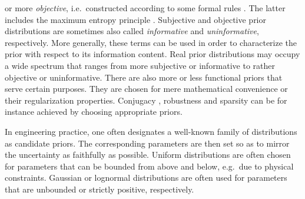 or more \emph{objective}, i.e.\ constructed according to some formal rules \cite{Bayesian:Kass1996,Bayesian:Ghosh2011}.
The latter includes the maximum entropy principle \cite{Statistics:Jaynes1957:a,Statistics:Jaynes1957:a,Bayesian:Jaynes1968}.
Subjective and objective prior distributions are sometimes also called \emph{informative} and \emph{uninformative}, respectively.
More generally, these terms can be used in order to characterize the prior with respect to its information content.
Real prior distributions may occupy a wide spectrum that ranges from more subjective or informative to rather objective or uninformative.
There are also more or less functional priors that serve certain purposes.
They are chosen for mere mathematical convenience or their regularization properties.
Conjugacy \cite{Bayesian:Diaconis1979}, robustness \cite{Bayesian:Insua2000} and sparsity \cite{Statistics:Tibshirani1996,Statistics:Park2008,Statistics:Ji2008}
can be for instance achieved by choosing appropriate priors.
\par %
In engineering practice, one often designates a well-known family of distributions as candidate priors.
The corresponding parameters are then set so as to mirror the uncertainty as faithfully as possible.
Uniform distributions are often chosen for parameters that can be bounded from above and below, e.g.\ due to physical constraints.
Gaussian or lognormal distributions are often used for parameters that are unbounded or strictly positive, respectively.